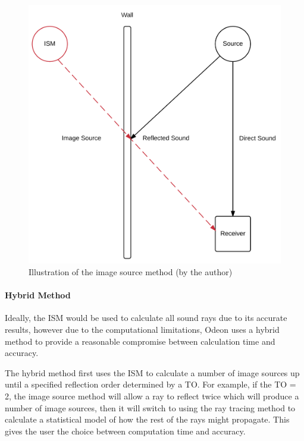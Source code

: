 \documentclass[../../main.tex]{subfiles}
\begin{document}
		\begin{figure}[ht]
			\center\includegraphics[scale = 0.3]{Sections/Background/images/ISM.png}
			\caption{Illustration of the image source method (by the author)}
			\label{ISMPic}
		\end{figure}

		\paragraph{Hybrid Method}

			Ideally, the \ac{ISM} would be used to calculate all sound rays due to its accurate results, however due to the computational limitations, Odeon uses a hybrid method to provide a reasonable compromise between calculation time and accuracy.

			The hybrid method first uses the \ac{ISM} to calculate a number of image sources up until a specified reflection order determined by a \ac{TO}. For example, if the \ac{TO} = 2, the image source method will allow a ray to reflect twice which will produce a number of image sources, then it will switch to using the ray tracing method to calculate a statistical model of how the rest of the rays might propagate. This gives the user the choice between computation time and accuracy.
\end{document}
